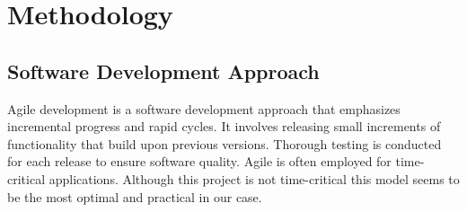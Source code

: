 \chapter{Methodology}
\section{Software Development Approach}
Agile development is a software development approach that emphasizes incremental progress and rapid cycles. It involves releasing small increments of functionality that build upon previous versions. Thorough testing is conducted for each release to ensure software quality. Agile is often employed for time-critical applications. Although this project is not time-critical this model seems to be the most optimal and practical in our case.
\begin{figure}[hbt!]
\end{figure}
\newpage
